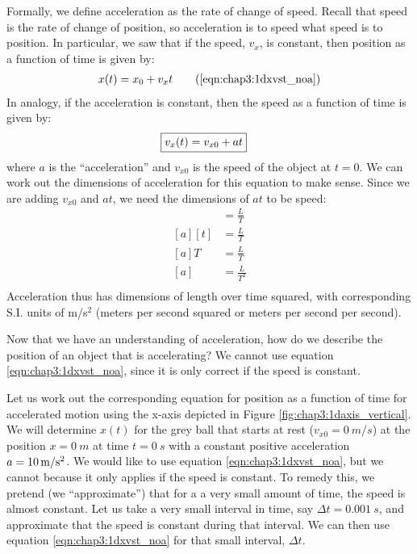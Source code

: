 Formally, we define acceleration as the rate of change of speed. Recall that speed is the rate of change of position, so acceleration is to speed what speed is to position. In particular, we saw that if the speed, $v_x$, is constant, then position as a function of time is given by:
\begin{align}
x(t) = x_0 + v_xt \tag{\ref{eqn:chap3:1dxvst_noa}}
\end{align} 
In analogy, if the acceleration is constant, then the speed as a function of time is given by:
\begin{align}
\label{eqn:chap3L1dvvst}
\Aboxed{v_x(t) = v_{x0} + at }
\end{align}
where $a$ is the ``acceleration'' and $v_{x0}$ is the speed of the object at $t=0$. We can work out the dimensions of acceleration for this equation to make sense. Since we are adding $v_{x0}$ and $at$, we need the dimensions of $at$ to be speed:
\begin{align*}
[at] &= \frac{L}{T} \\
[a][t] &= \frac{L}{T} \\
[a]T&= \frac{L}{T} \\
[a]&= \frac{L}{T^2} \\
\end{align*}
Acceleration thus has dimensions of length over time squared, with corresponding S.I. units of m/s$^2$ (meters per second squared or meters per second per second). 

Now that we have an understanding of acceleration, how do we describe the position of an object that is accelerating? We cannot use equation \ref{eqn:chap3:1dxvst_noa}, since it is only correct if the speed is constant. 


Let us work out the corresponding equation for position as a function of time for accelerated motion using the x-axis depicted in Figure \ref{fig:chap3:1daxis_vertical}. We will determine $x(t)$ for the grey ball that starts at rest ($v_{x0}=\SI{0}{m\per s}$) at the position $x=\SI{0}{m}$ at time $t=\SI{0}{s}$ with a constant positive acceleration $a=\SI{10}{m\per s\squared}$. We would like to use equation \ref{eqn:chap3:1dxvst_noa}, but we cannot because it only applies if the speed is constant. To remedy this, we pretend (we ``approximate'') that for a a very small amount of time, the speed is almost constant. Let us take a very small interval in time, say $\Delta t=\SI{0.001}{s}$, and approximate that the speed is constant during that interval. We can then use equation \ref{eqn:chap3:1dxvst_noa} for that small interval, $\Delta t$. 

